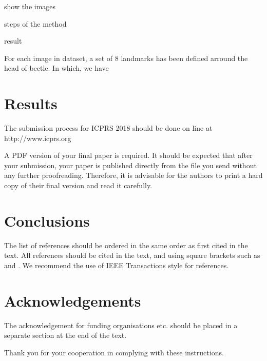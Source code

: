 \documentclass[10pt]{article}
\begin{document}
show the images

steps of the method

result

For each image in dataset, a set of 8 landmarks has been defined arround the head of beetle. In which, we have 

\section{Results}
The submission process for ICPRS 2018 should be done on
line at http://www.icprs.org

A PDF version of your final paper is required. It should
be expected that after your submission, your paper is
published directly from the file you send without any further
proofreading. Therefore, it is advisable for the authors to
print a hard copy of their final version and read it carefully.

\section{Conclusions}
The list of references should be ordered in the same order as
first cited in the text. All references should be cited in the
text, and using square brackets such as \cite{ref01} and \cite{ref01,ref02}. We
recommend the use of IEEE Transactions style for references.

\section*{Acknowledgements}
The acknowledgement for funding organisations etc. should
be placed in a separate section at the end of the text.



Thank you for your cooperation in complying with these
instructions.



\end{document}
